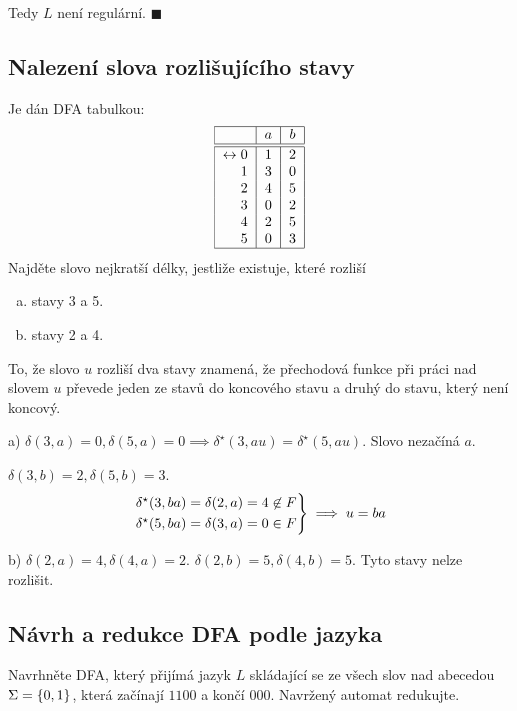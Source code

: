 Tedy $L$ není regulární. $\blacksquare$

\subsection{Nalezení slova rozlišujícího stavy}
Je dán DFA tabulkou:
\[
\begin{tabular}{|r|c|c|}
    \hline
    & $a$ & $b$\\
    \hline
    \hline
    $\leftrightarrow 0$& $1$ & $2$\\
    $1$                & $3$ & $0$\\
    $2$                & $4$ & $5$\\
    $3$                & $0$ & $2$\\
    $4$                & $2$ & $5$\\
    $5$                & $0$ & $3$\\
    \hline
\end{tabular}
\]
Najděte slovo nejkratší délky, jestliže existuje, které rozliší
\begin{enumerate}[a), noitemsep]
    \item stavy 3 a 5.
    \item stavy 2 a 4.
\end{enumerate}
To, že slovo $u$ rozliší dva stavy znamená, že přechodová funkce při práci nad slovem $u$ převede jeden ze stavů do
koncového stavu a druhý do stavu, který není koncový.

a) $\delta(3,a) = 0, \delta(5,a)=0 \implies \delta^\star(3, au) = \delta^\star (5, au)$.
Slovo nezačíná $a$.

$\delta(3,b) = 2, \delta(5, b) = 3$.
\[
\begin{rcases*}
\delta^\star(3,ba) = \delta(2,a) = 4 \not\in F\\
\delta^\star(5,ba) = \delta(3,a) = 0 \in F
\end{rcases*} \implies u = ba
\]

b) $\delta(2,a) = 4, \delta(4,a) =2$. $\delta(2,b)=5, \delta(4,b)=5$. Tyto stavy nelze rozlišit.

\subsection{Návrh a redukce DFA podle jazyka}
Navrhněte DFA, který přijímá jazyk $L$ skládající se ze všech slov nad abecedou $\Sigma = \left\lbrace 0, 1 \right\rbrace$, která začínají
$1100$ a končí $000$. Navržený automat redukujte.


